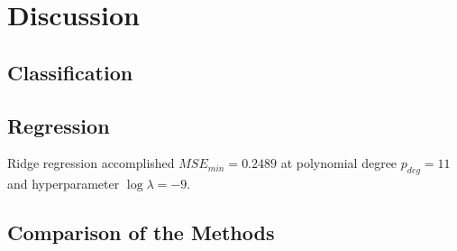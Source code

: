 \section{Discussion}
    \subsection{Classification}
             
            
        
            
    \subsection{Regression}
        Ridge regression accomplished $MSE_{min}=0.2489$ at polynomial degree $p_{deg}=11$ and hyperparameter $\log\lambda=-9$.
             
            
     
    \subsection{Comparison of the Methods}
        
        
        
        
        
